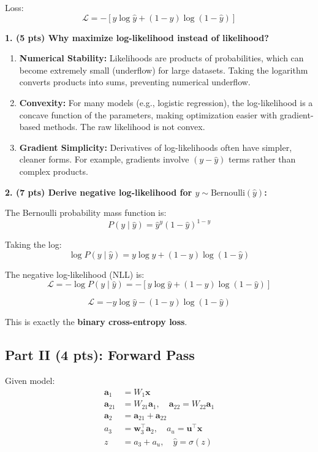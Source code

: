\documentclass[11pt]{article}
\begin{document}
Loss:
\[
\mathcal{L} = -[y \log \hat{y} + (1 - y)\log(1 - \hat{y})]
\]

\textbf{1. (5 pts) Why maximize log-likelihood instead of likelihood?}

\begin{enumerate}[label=(\alph*)]
    \item \textbf{Numerical Stability:} Likelihoods are products of probabilities, which can become extremely small (underflow) for large datasets. Taking the logarithm converts products into sums, preventing numerical underflow.
    
    \item \textbf{Convexity:} For many models (e.g., logistic regression), the log-likelihood is a concave function of the parameters, making optimization easier with gradient-based methods. The raw likelihood is not convex.
    
    \item \textbf{Gradient Simplicity:} Derivatives of log-likelihoods often have simpler, cleaner forms. For example, gradients involve $(y - \hat{y})$ terms rather than complex products.
\end{enumerate}

\vspace{1em}
\textbf{2. (7 pts) Derive negative log-likelihood for $y \sim \text{Bernoulli}(\hat{y})$:}

The Bernoulli probability mass function is:
\[
P(y \mid \hat{y}) = \hat{y}^y (1 - \hat{y})^{1-y}
\]

Taking the log:
\[
\log P(y \mid \hat{y}) = y \log \hat{y} + (1 - y) \log(1 - \hat{y})
\]

The negative log-likelihood (NLL) is:
\[
\mathcal{L} = -\log P(y \mid \hat{y}) = -\left[y \log \hat{y} + (1 - y) \log(1 - \hat{y})\right]
\]

\[
\boxed{\mathcal{L} = -y \log \hat{y} - (1 - y) \log(1 - \hat{y})}
\]

This is exactly the \textbf{binary cross-entropy loss}.

\subsection*{Part II (4 pts): Forward Pass}

Given model:
\begin{align*}
\mathbf{a}_1 &= W_1 \mathbf{x} \\
\mathbf{a}_{21} &= W_{21} \mathbf{a}_1, \quad \mathbf{a}_{22} = W_{22} \mathbf{a}_1 \\
\mathbf{a}_2 &= \mathbf{a}_{21} + \mathbf{a}_{22} \\
a_3 &= \mathbf{w}_3^\top \mathbf{a}_2, \quad a_u = \mathbf{u}^\top \mathbf{x} \\
z &= a_3 + a_u, \quad \hat{y} = \sigma(z)
\end{align*}
\end{document}
